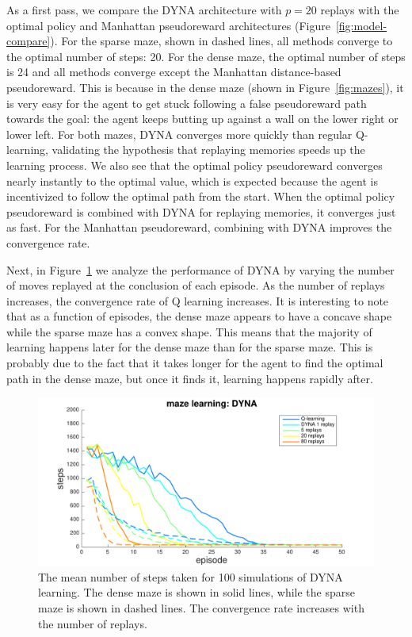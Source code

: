 \documentclass[notitlepage]{article}
\begin{document}
As a first pass, we compare the DYNA architecture with $p =20$ replays with the optimal policy and Manhattan pseudoreward architectures (Figure~\ref{fig:model-compare}). For the sparse maze, shown in dashed lines, all methods converge to the optimal number of steps: 20. For the dense maze, the optimal number of steps is 24 and all methods converge except the Manhattan distance-based pseudoreward. This is because in the dense maze (shown in Figure~\ref{fig:mazes}), it is very easy for the agent to get stuck following a false pseudoreward path towards the goal: the agent keeps butting up against a wall on the lower right or lower left. For both mazes, DYNA converges more quickly than regular Q-learning, validating the hypothesis that replaying memories speeds up the learning process. We also see that the optimal policy pseudoreward converges nearly instantly to the optimal value, which is expected because the agent is incentivized to follow the optimal path from the start. When the optimal policy pseudoreward is combined with DYNA for replaying memories, it converges just as fast. For the Manhattan pseudoreward, combining with DYNA improves the convergence rate. 

Next, in Figure~\ref{fig:dyna-compare} we analyze the performance of DYNA by varying the number of moves replayed at the conclusion of each episode. As the number of replays increases, the convergence rate of Q learning increases. It is interesting to note that as a function of episodes, the dense maze appears to have a concave shape while the sparse maze has a convex shape. This means that the majority of learning happens later for the dense maze than for the sparse maze. This is probably due to the fact that it takes longer for the agent to find the optimal path in the dense maze, but once it finds it, learning happens rapidly after. 

\begin{figure}[ht]
\includegraphics[width=\textwidth]{DYNAcompare}
\caption{The mean number of steps taken for 100 simulations of DYNA learning. The dense maze is shown in solid lines, while the sparse maze is shown in dashed lines. The convergence rate increases with the number of replays.}
\label{fig:dyna-compare}
\end{figure}
\end{document}
